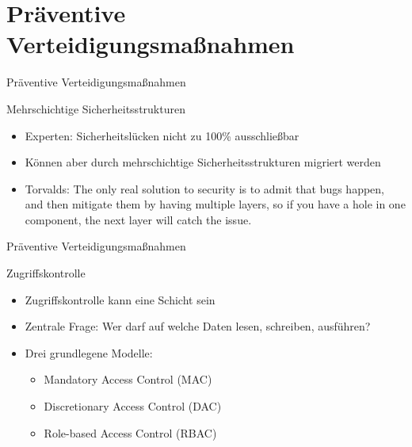\newcommand{\gqq}[1]{\glqq#1\grqq}

\section{Präventive Verteidigungsmaßnahmen}

\begin{frame}{Präventive Verteidigungsmaßnahmen}
        \begin{block}{Mehrschichtige Sicherheitsstrukturen}
                \begin{itemize}
                        \item Experten: Sicherheitslücken nicht zu 100\% ausschließbar
                        \pause
                        \item Können aber durch mehrschichtige Sicherheitsstrukturen migriert werden
                        \pause
                        \item Torvalds: \gqq{The only real solution to security is to admit that bugs happen, and then mitigate them by having multiple layers, so if you have a hole in one component, the next layer will catch the issue.} 
                \end{itemize}
        \end{block}
\end{frame}

\begin{frame}{Präventive Verteidigungsmaßnahmen}
        \begin{block}{Zugriffskontrolle}
                \begin{itemize}
                        \item Zugriffskontrolle kann eine Schicht sein
                        \pause
                        \item Zentrale Frage: Wer darf auf welche Daten lesen, schreiben, ausführen?
                        \pause
                        \item Drei grundlegene Modelle:
                        \pause
                        \begin{itemize}
                                \item Mandatory Access Control (MAC)
                                \pause
                                \item Discretionary Access Control (DAC)
                                \pause
                                \item Role-based Access Control (RBAC)
                        \end{itemize}
                \end{itemize}
        \end{block}
\end{frame}

